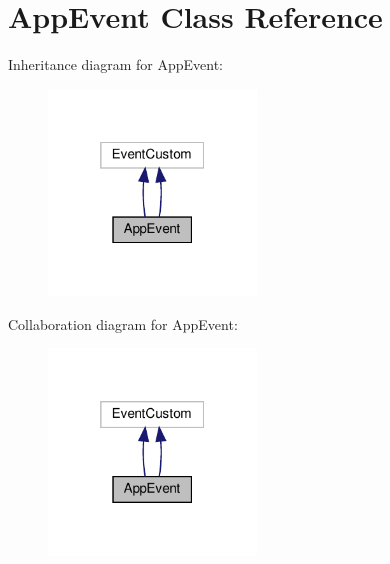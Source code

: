 \hypertarget{classAppEvent}{}\section{App\+Event Class Reference}
\label{classAppEvent}


Inheritance diagram for App\+Event\+:
\nopagebreak
\begin{figure}[H]
\begin{center}
\leavevmode
\includegraphics[width=157pt]{classAppEvent__inherit__graph}
\end{center}
\end{figure}


Collaboration diagram for App\+Event\+:
\nopagebreak
\begin{figure}[H]
\begin{center}
\leavevmode
\includegraphics[width=157pt]{classAppEvent__coll__graph}
\end{center}
\end{figure}
